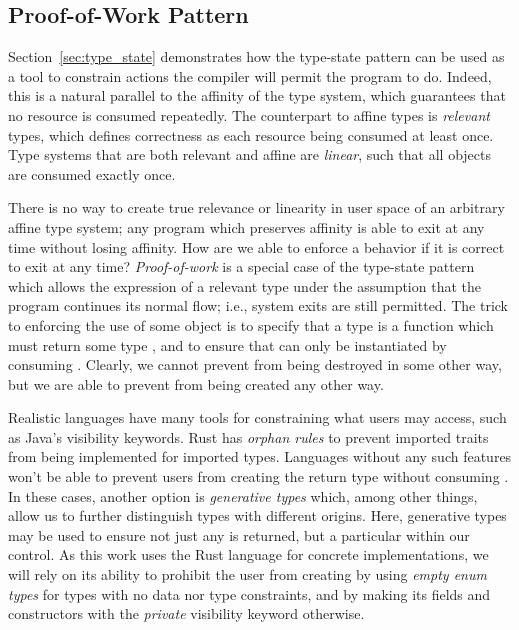 \subsection{Proof-of-Work Pattern}
\label{sec:proof_of_work}
Section~\ref{sec:type_state} demonstrates how the type-state pattern can be used as a tool to constrain actions the compiler will permit the program to do. Indeed, this is a natural parallel to the affinity of the type system, which guarantees that no resource is consumed repeatedly. The counterpart to affine types is \textit{relevant} types, which defines correctness as each resource being consumed at least once. Type systems that are both relevant and affine are \textit{linear}, such that all objects are consumed exactly once.

There is no way to create true relevance or linearity in user space of an arbitrary affine type system; any program which preserves affinity is able to exit at any time without losing affinity. How are we able to enforce a behavior if it is correct to exit at any time? \textit{Proof-of-work} is a special case of the type-state pattern which allows the expression of a relevant type under the assumption that the program continues its normal flow; i.e., system exits are still permitted. The trick to enforcing the use of some object  is to specify that a type is a function which must return some type , and to ensure that  can only be instantiated by consuming . Clearly, we cannot prevent  from being destroyed in some other way, but we are able to prevent  from being created any other way.

Realistic languages have many tools for constraining what users may access, such as Java's visibility keywords. Rust has \textit{orphan rules} to prevent imported traits from being implemented for imported types. Languages without any such features won't be able to prevent users from creating the return type  without consuming . In these cases, another option is \textit{generative types} which, among other things, allow us to further distinguish types with different origins. Here, generative types may be used to ensure not just any  is returned, but a particular  within our control. As this work uses the Rust language for concrete implementations, we will rely on its ability to prohibit the user from creating  by using \textit{empty enum types} for types with no data nor type constraints, and by making its fields and constructors with the \textit{private} visibility keyword otherwise\cite{exotic_sizes}.

